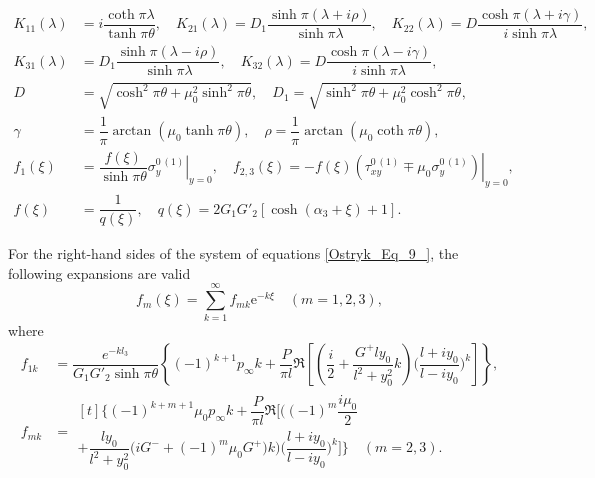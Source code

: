 \[
\begin{aligned}
K_{11} (\lambda )&=i\dfrac{\coth \pi \lambda }{\tanh \pi \theta } , \quad  K_{21} (\lambda )=D_{1} \dfrac{\sinh \pi (\lambda +i\rho )}{\sinh \pi \lambda } ,  \quad K_{22} (\lambda )=D\dfrac{\cosh \pi (\lambda +i\gamma )}{i\sinh \pi \lambda } ,
\\
K_{31} (\lambda )&=D_{1} \dfrac{\sinh \pi (\lambda -i\rho )}{\sinh \pi \lambda } ,  \quad  K_{32} (\lambda )=D\dfrac{\cosh \pi (\lambda -i\gamma )}{i\sinh \pi \lambda } ,
\\
D&=\sqrt{\cosh ^{2} \pi \theta +\mu _{0}^{2} \sinh ^{2} \pi \theta } ,  \quad  D_{1} =\sqrt{\sinh ^{2} \pi \theta +\mu _{0}^{2} \cosh ^{2} \pi \theta } ,
\\
\gamma &=\dfrac{1}{\pi } \arctan \left(\mu _{0} \tanh \pi \theta \right),  \quad  \rho =\dfrac{1}{\pi } \arctan \left(\mu _{0} \coth \pi \theta \right),
\\
f_{1} (\xi )&=\dfrac{f(\xi )}{\sinh \pi \theta } \left. \sigma _{y}^{0\, (1)} \right|_{y=0} ,  \quad f_{2,3} (\xi )=-f(\xi )\left. \left(\tau _{xy}^{0\, (1)} \mp \mu _{0} \sigma _{y}^{0\, (1)} \right)\right|_{y=0} ,
\\
f(\xi )&=\dfrac{1}{q(\xi )} ,   \quad q(\xi )=2G_{1} G'_{2} [\cosh (\alpha _{3} +\xi )+1].  
\end{aligned}
\]

For the right-hand sides of the system of equations \eqref{Ostryk_Eq_9_}, the following expansions are valid
\begin{equation} \label{Ostryk_Eq_11_} 
f_{m} (\xi )=\sum _{k=1}^{\infty }f_{mk} \mathrm{e}^{-k\xi }  \quad   (m=1,2,3),
\end{equation}  
where
\[
\begin{aligned}
f_{1k} &=\dfrac{e^{-kl_{3} } }{G_{1} G'_{2} \sinh \pi \theta } \left\{(-1)^{k+1} p_{\infty } k+\dfrac{P}{\pi l} \Re \left[\left(\dfrac{i}{2} +\dfrac{G^{+} ly_{0} }{l^{2} +y_{0}^{2} } k\right)\bigg(\dfrac{l+iy_{0} }{l-iy_{0} } \bigg)^{k} \right]\right\},
\\
f_{mk} &=
\begin{multlined}[t]
	\Bigg\{(-1)^{k+m+1} \mu _{0} p_{\infty } k+\dfrac{P}{\pi l} \Re \Bigg[\Bigg((-1)^{m} \dfrac{i\mu _{0} }{2} 
	\\[-1em]
	+\dfrac{ly_{0} }{l^{2} +y_{0}^{2} } \big(iG^{-} +(-1)^{m} \mu _{0} G^{+} \big)k\Bigg)\bigg(\dfrac{l+iy_{0} }{l-iy_{0} } \bigg)^{k} \Bigg]\Bigg\}  \quad (m=2,3).  
\end{multlined}
\end{aligned}
\]

